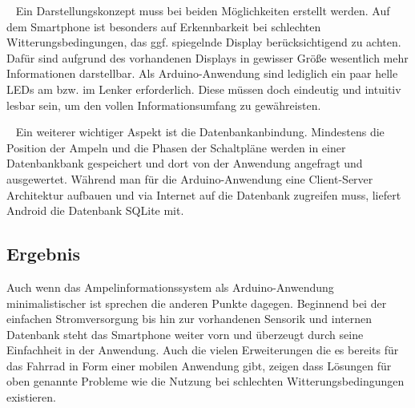 \begin{description}[leftmargin=0.7cm,style=nextline]
  \item[Darstellung] ~ Ein Darstellungskonzept muss bei beiden Möglichkeiten erstellt werden. Auf dem \gls{Smartphone} ist besonders auf Erkennbarkeit bei schlechten Witterungsbedingungen, das ggf. spiegelnde Display berücksichtigend zu achten. Dafür sind aufgrund des vorhandenen Displays in gewisser Größe wesentlich mehr Informationen darstellbar. Als \gls{Arduino}-Anwendung sind lediglich ein paar helle \glspl{LED} am bzw. im Lenker erforderlich. Diese müssen doch eindeutig und intuitiv lesbar sein, um den vollen Informationsumfang zu gewähreisten.\\
 \item[Datenbankanbindung] ~ Ein weiterer wichtiger Aspekt ist die Datenbankanbindung. Mindestens die Position der Ampeln und die Phasen der Schaltpläne werden in einer Datenbankbank gespeichert und dort von der Anwendung angefragt und ausgewertet. Während man für die \gls{Arduino}-Anwendung eine Client-Server Architektur aufbauen und via Internet auf die Datenbank zugreifen muss, liefert Android die Datenbank SQLite mit.\\
\end{description}
\subsection*{Ergebnis}  
Auch wenn das Ampelinformationssystem als \gls{Arduino}-Anwendung minimalistischer ist sprechen die anderen Punkte dagegen. Beginnend bei der einfachen Stromversorgung bis hin zur vorhandenen Sensorik und internen Datenbank steht das \gls{Smartphone} weiter vorn und überzeugt durch seine Einfachheit in der Anwendung. Auch die vielen Erweiterungen die es bereits für das Fahrrad in Form einer mobilen Anwendung gibt, zeigen dass Lösungen für oben genannte Probleme wie die Nutzung bei schlechten Witterungsbedingungen existieren.
